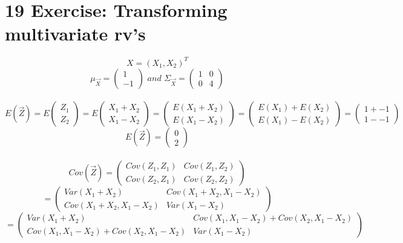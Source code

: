 \documentclass[pdftex,12pt,a4paper]{article}
\begin{document}


\section*{19 Exercise: Transforming multivariate rv's}
	$$X=(X_1,X_2)^T$$
    $$\mu_{\vec{X}} =
    	\begin{pmatrix}
    		1\\
    		-1
    	\end{pmatrix}
    \textit{ and }  
    \Sigma_{\vec{X}} =
    	\begin{pmatrix}
    		1 & 0\\
    		0 & 4
    	\end{pmatrix}$$
    \\
    $$E(\vec{Z}) = E
    	\begin{pmatrix}
    		Z_1\\
    		Z_2
    	\end{pmatrix} = E
    	\begin{pmatrix}
    		X_1 + X_2\\
    		X_1 - X_2
    	\end{pmatrix} = 
    	\begin{pmatrix}
    		E(X_1 + X_2)\\
    		E(X_1 - X_2)
    	\end{pmatrix} =
    	\begin{pmatrix}
    		E(X_1) + E(X_2)\\
    		E(X_1) - E(X_2)
    	\end{pmatrix} =
    	\begin{pmatrix}
    		1 + -1\\
    		1 - -1
    	\end{pmatrix}$$
    $$E(\vec{Z}) = 
    	\begin{pmatrix}
    		0\\
    		2
    	\end{pmatrix}$$
    \\
    $$Cov(\vec{Z})=
    	\begin{pmatrix}
    		Cov(Z_1, Z_1) & Cov(Z_1, Z_2)\\
    		Cov(Z_2, Z_1) & Cov(Z_2, Z_2)
    	\end{pmatrix}$$
    $$
    	=
    	\begin{pmatrix}
    		Var(X_1+X_2) & Cov(X_1+X_2, X_1-X_2)\\
    		Cov(X_1+X_2, X_1-X_2) & Var(X_1-X_2)
    	\end{pmatrix}$$
    $$
    	=
    	\begin{pmatrix}
    		Var(X_1+X_2) & Cov(X_1, X_1-X_2) + Cov(X_2, X_1-X_2)\\
    		Cov(X_1, X_1-X_2) + Cov(X_2, X_1-X_2) & Var(X_1-X_2)
    	\end{pmatrix}$$
\end{document}
